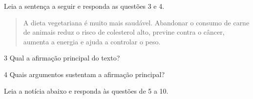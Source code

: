 

Leia a sentença a seguir e responda as questões 3 e 4. 

\begin{quote}

A dieta vegetariana é muito mais saudável. Abandonar o consumo de carne de animais 
reduz o risco de colesterol alto, previne contra o câncer, aumenta a energia e ajuda a
controlar o peso.

\end{quote}

\num{3} Qual a afirmação principal do texto?


\num{4} Quais argumentos sustentam a afirmação principal?


Leia a notícia abaixo e responda às questões de 5 a 10.


